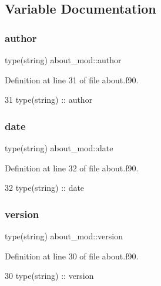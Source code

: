 \subsection{Variable Documentation}
\mbox{\label{namespaceabout__mod_a7c3a72ae7ba5fc7d8a4bf133605f58c3}} 
\subsubsection{\texorpdfstring{author}{author}}
{\footnotesize\ttfamily type(string) about\+\_\+mod\+::author\hspace{0.3cm}{\ttfamily [private]}}



Definition at line 31 of file about.\+f90.


\begin{DoxyCode}
31     \textcolor{keywordtype}{type}(string) :: author
\end{DoxyCode}
\mbox{\label{namespaceabout__mod_aaac12f65380fb0f10916b3744d9e5a0b}} 
\subsubsection{\texorpdfstring{date}{date}}
{\footnotesize\ttfamily type(string) about\+\_\+mod\+::date\hspace{0.3cm}{\ttfamily [private]}}



Definition at line 32 of file about.\+f90.


\begin{DoxyCode}
32     \textcolor{keywordtype}{type}(string) :: date
\end{DoxyCode}
\mbox{\label{namespaceabout__mod_af0051041c5a98e3eb7284580236db3a0}} 
\subsubsection{\texorpdfstring{version}{version}}
{\footnotesize\ttfamily type(string) about\+\_\+mod\+::version\hspace{0.3cm}{\ttfamily [private]}}



Definition at line 30 of file about.\+f90.


\begin{DoxyCode}
30     \textcolor{keywordtype}{type}(string) :: version
\end{DoxyCode}
